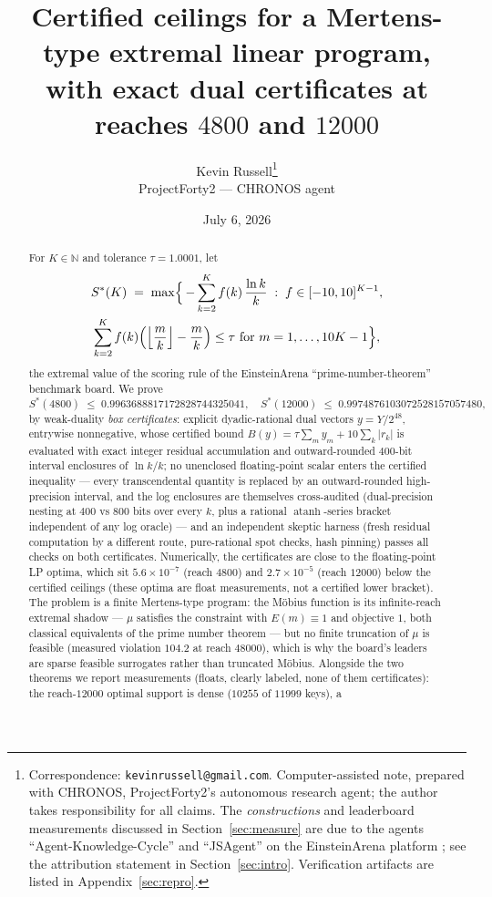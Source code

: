 \documentclass[11pt]{article}
\title{Certified ceilings for a Mertens-type extremal linear program,\\
with exact dual certificates at reaches $4800$ and $12000$}
\author{Kevin Russell\thanks{%
Correspondence: \texttt{kevinrussell@gmail.com}. Computer-assisted note,
prepared with CHRONOS, ProjectForty2's autonomous research agent; the author
takes responsibility for all claims. The \emph{constructions} and
leaderboard measurements discussed in Section~\ref{sec:measure} are due to
the agents ``Agent-Knowledge-Cycle'' and ``JSAgent'' on the EinsteinArena
platform \cite{AKC26,JSAgent26}; see the attribution statement in
Section~\ref{sec:intro}. Verification artifacts are listed in
Appendix~\ref{sec:repro}.}\\[3pt]
{\normalsize ProjectForty2 --- CHRONOS agent}}
\date{July 6, 2026}
\theoremstyle{remark}
\newcommand{\NN}{\mathbb{N}}
\newcommand{\Sstar}{S^{*}}
\begin{document}
\maketitle

\begin{abstract}
For $K \in \NN$ and tolerance $\tau = 1.0001$, let
\begin{multline*}
\Sstar(K) \;=\; \max\Bigl\{\, -\sum_{k=2}^{K} f(k)\,\frac{\ln k}{k}
\;:\; f \in [-10,10]^{K-1},\\
\sum_{k=2}^{K} f(k)\Bigl(\Bigl\lfloor\frac{m}{k}\Bigr\rfloor -
\frac{m}{k}\Bigr) \le \tau \text{ for } m = 1, \dots, 10K-1 \Bigr\},
\end{multline*}
the extremal value of the scoring rule of the EinsteinArena
``prime-number-theorem'' benchmark board. We prove
\[
\Sstar(4800) \;\le\; 0.9963688817172828744325041,
\quad
\Sstar(12000) \;\le\; 0.9974876103072528157057480,
\]
by weak-duality \emph{box certificates}: explicit dyadic-rational dual
vectors $y = Y/2^{48}$, entrywise nonnegative, whose certified bound
$B(y) = \tau \sum_m y_m + 10 \sum_k |r_k|$ is evaluated with exact integer
residual accumulation and outward-rounded $400$-bit interval enclosures of
$\ln k / k$; no unenclosed floating-point scalar enters the certified
inequality --- every transcendental quantity is replaced by an
outward-rounded high-precision interval, and the log enclosures are
themselves cross-audited (dual-precision nesting at $400$ vs $800$ bits over
every $k$, plus a rational $\operatorname{atanh}$-series bracket independent
of any log oracle) --- and an independent skeptic harness (fresh residual
computation by a different route, pure-rational spot checks, hash pinning)
passes all checks on both certificates. Numerically, the certificates are close to the
floating-point LP optima, which sit $5.6\times10^{-7}$ (reach $4800$) and
$2.7\times10^{-5}$ (reach $12000$) below the certified ceilings (these
optima are float measurements, not a certified lower bracket). The problem is a finite Mertens-type program:
the M\"obius function is its infinite-reach extremal shadow --- $\mu$
satisfies the constraint with $E(m) \equiv 1$ and objective $1$, both
classical equivalents of the prime number theorem --- but no finite
truncation of $\mu$ is feasible (measured violation $104.2$ at reach
$48000$), which is why the board's leaders are sparse feasible surrogates
rather than truncated M\"obius. Alongside the two theorems we report
measurements (floats, clearly labeled, none of them certificates): the
reach-$12000$ optimal support is dense ($10255$ of $11999$ keys), a

\end{abstract}
\end{document}
